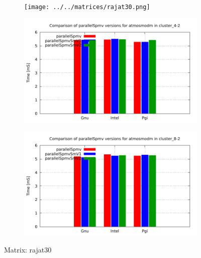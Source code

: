\begin{figure} [ht!]
    \centering
    \captionsetup{justification=centering, singlelinecheck=false}
    \begin{subfigure}{.25\textwidth}
      \centering
      \hspace*{-1.5cm} 
      \texttt{[image: ../../matrices/rajat30.png]}
      \label{fig:rajat30_matrix}
    \end{subfigure}%
    \begin{subfigure}{.37\textwidth}
      \centering
      \hspace*{-1.0cm} 
      \includegraphics[page=5, width=0.95\linewidth]{../plots/myCluster_4-2.pdf}
      \label{fig:rajat30_performance}
    \end{subfigure}
    \begin{subfigure}{.37\textwidth}
      \centering
      \hspace*{-1.0cm} 
      \includegraphics[page=5, width=0.95\linewidth]{../plots/myCluster_8-2.pdf}
      \label{fig:rajat30_performance}
    \end{subfigure}
\caption{Matrix: rajat30}
\label{fig:rajat30}
\end{figure}


